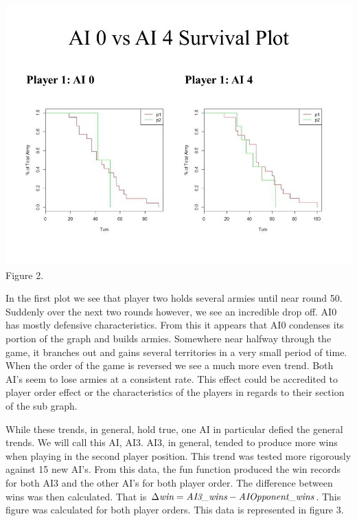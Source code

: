 \documentclass[12pt]{article}  %
\begin{document}
\begin{center}
\includegraphics[scale=0.6]{images/Figure_2.jpg}\\
{\footnotesize Figure 2.}
\end{center}

In the first plot we see that player two holds several armies until near round 50. Suddenly over the next two rounds however, we see an incredible drop off. AI0 has mostly defensive characteristics. From this it appears that AI0 condenses its portion of the graph and builds armies. Somewhere near halfway through the game, it branches out and gains several territories in a very small period of time. When the order of the game is reversed we see a much more even trend. Both AI’s seem to lose armies at a consistent rate. This effect could be accredited to player order effect or the characteristics of the players in regards to their section of the sub graph. 


While these trends, in general, hold true, one AI in particular defied the general trends. We will call this AI, AI3. AI3, in general, tended to produce more wins when playing in the second player position. This trend was tested more rigorously against 15 new AI’s. From this data, the fun function produced the win records for both AI3 and the other AI’s for both player order. The difference between wins was then calculated. That is $\Delta \emph{win} = \emph{AI3\_wins} - \emph{AIOpponent\_wins}$. This figure was calculated for both player orders. This data is represented in figure 3.
\end{document}
